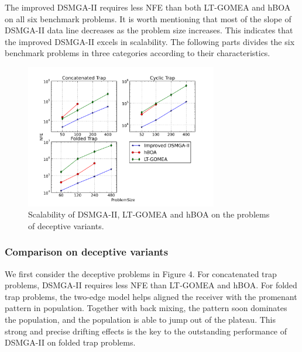 \documentclass{sig-alternate-05-2015}
\begin{document}
The improved DSMGA-II requires less NFE than both LT-GOMEA and hBOA on all six benchmark problems.
It is worth mentioning that most of the slope of DSMGA-II data line decreases as the problem size increases.
This indicates that the improved DSMGA-II excels in scalability.
The following parts divides the six benchmark problems in three categories according to their characteristics. 


\begin{figure}
\centering
\includegraphics[width=3.3in]{trapResults}
\caption{Scalability of DSMGA-II, LT-GOMEA and hBOA on the problems of deceptive variants.}
\end{figure}

\subsubsection{ Comparison on deceptive variants }


We first consider the deceptive problems in Figure 4.
For concatenated trap problems, DSMGA-II requires less NFE than LT-GOMEA and hBOA.
For folded trap problems, the two-edge model helps aligned the receiver with the promenant pattern in population.
Together with back mixing, the pattern soon dominates the population, and the population is able to jump out of the plateau. 
This strong and precise drifting effects is the key to the outstanding performance of DSMGA-II on folded trap problems.
\end{document}
